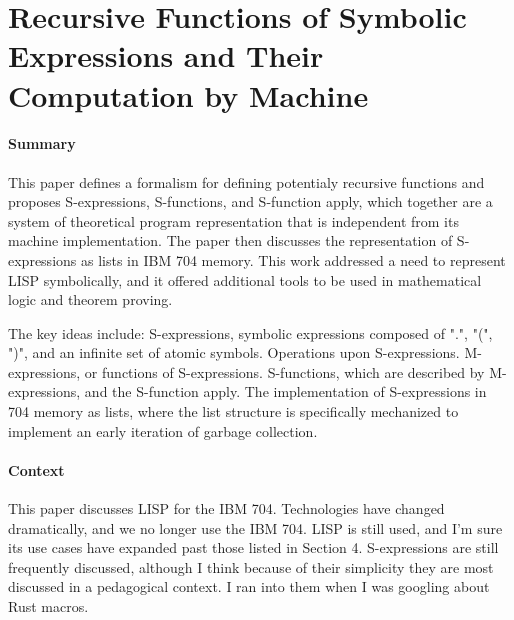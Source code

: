 \section {Recursive Functions of Symbolic Expressions and Their Computation by
Machine \cite{mccarthy1959recursive}}

\paragraph{\textbf{Summary}}
This paper defines a formalism for defining potentialy recursive functions and
proposes S-expressions, S-functions, and S-function apply, which together are a
system of theoretical program representation that is independent from its
machine implementation. The paper then discusses the representation of
S-expressions as lists in IBM 704 memory. This work addressed a need to
represent LISP symbolically, and it offered additional tools to be used in
mathematical logic and theorem proving.

The key ideas include: S-expressions, symbolic expressions composed of ".", "(",
")", and an infinite set of atomic symbols. Operations upon S-expressions.
M-expressions, or functions of S-expressions. S-functions, which are described
by M-expressions, and the S-function apply. The implementation of S-expressions
in 704 memory as lists, where the list structure is specifically mechanized to
implement an early iteration of garbage collection.
\paragraph{\textbf{Context}}
This paper discusses LISP for the IBM 704. Technologies have changed
dramatically, and we no longer use the IBM 704. LISP is still used, and I'm sure
its use cases have expanded past those listed in Section 4. S-expressions are
still frequently discussed, although I think because of their simplicity they
are most discussed in a pedagogical context. I ran into them when I was googling
about Rust macros.
